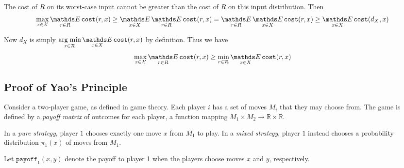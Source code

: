 The cost of $R$ on its worst-case input cannot be greater than the cost of $R$ on this input distribution. Then
\[\max_{x\in\mathcal{X}}\Expected_{r\in R}\texttt{cost}(r,x)
\ge \Expected_{x\in X}\Expected_{r\in R}\texttt{cost}(r,x)
= \Expected_{r\in R}\Expected_{x\in X}\texttt{cost}(r,x)
\ge \Expected_{x\in X}\texttt{cost}(d_X,x)\]

Now $d_X$ is simply $\argmin_{r\in\mathcal{R}}\Expected_{x\in X}\texttt{cost}(r,x)$ by definition. Thus we have
\[\max_{x\in\mathcal{X}}\Expected_{r\in R}\texttt{cost}(r,x) \ge \min_{r\in\mathcal{R}}\Expected_{x\in X}\texttt{cost}(r,x)\]

\subsection{Proof of Yao's Principle}

Consider a two-player game, as defined in game theory. Each player $i$ has a set of moves $M_i$ that they may choose from. The game is defined by a \emph{payoff matrix} of outcomes for each player, a function mapping $M_1 \times M_2 \rightarrow \mathds{R} \times \mathds{R}$.

In a \emph{pure strategy}, player $1$ chooses exactly one move $x$ from $M_1$ to play. In a \emph{mixed strategy}, player $1$ instead chooses a probability distribution $\pi_1(x)$ of moves from $M_1$.

Let $\texttt{payoff}_1(x, y)$ denote the payoff to player 1 when the players choose moves $x$ and $y$, respectively.





